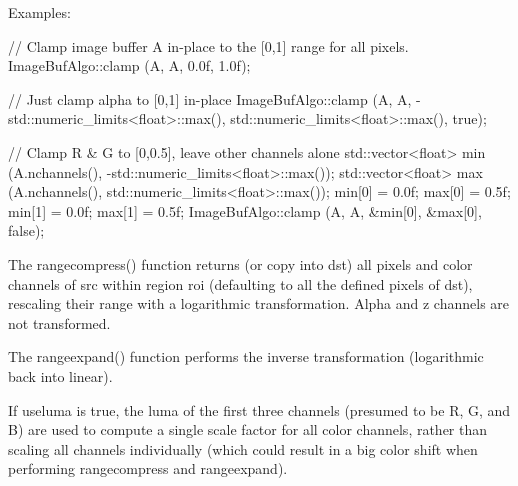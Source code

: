 \smallskip
\noindent Examples:
\begin{code}
    // Clamp image buffer A in-place to the [0,1] range for all pixels.
    ImageBufAlgo::clamp (A, A, 0.0f, 1.0f);

    // Just clamp alpha to [0,1] in-place
    ImageBufAlgo::clamp (A, A, -std::numeric_limits<float>::max(),
                         std::numeric_limits<float>::max(), true);

    // Clamp R & G to [0,0.5], leave other channels alone
    std::vector<float> min (A.nchannels(), -std::numeric_limits<float>::max());
    std::vector<float> max (A.nchannels(), std::numeric_limits<float>::max());
    min[0] = 0.0f;  max[0] = 0.5f;
    min[1] = 0.0f;  max[1] = 0.5f;
    ImageBufAlgo::clamp (A, A, &min[0], &max[0], false);
\end{code}
\apiend


 
 

The {\cf rangecompress()} function returns (or copy into dst) all pixels and
color channels of {\cf src} within region {\cf roi} (defaulting to all the
defined pixels of {\cf dst}), rescaling their range with a logarithmic
transformation. Alpha and z channels are not transformed.

The {\cf rangeexpand()} function performs the inverse transformation
(logarithmic back into linear).

If {\cf useluma} is true, the luma of the first three channels (presumed
to be R, G, and B) are used to compute a single scale factor for all
color channels, rather than scaling all channels individually (which
could result in a big color shift when performing {\cf rangecompress}
and {\cf rangeexpand}).

